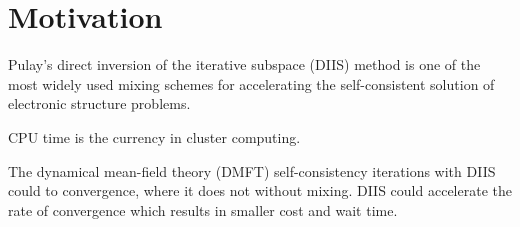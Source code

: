 \chapter{Motivation}
\label{ch:motivation}


Pulay's direct inversion of the iterative subspace (DIIS) method is one of the most widely used mixing schemes for accelerating the self-consistent solution of electronic structure problems.

CPU time is the currency in cluster computing.

The dynamical mean-field theory (DMFT) self-consistency iterations with DIIS could to convergence, where it does not without mixing.
DIIS could accelerate the rate of convergence which results in smaller cost and wait time.

